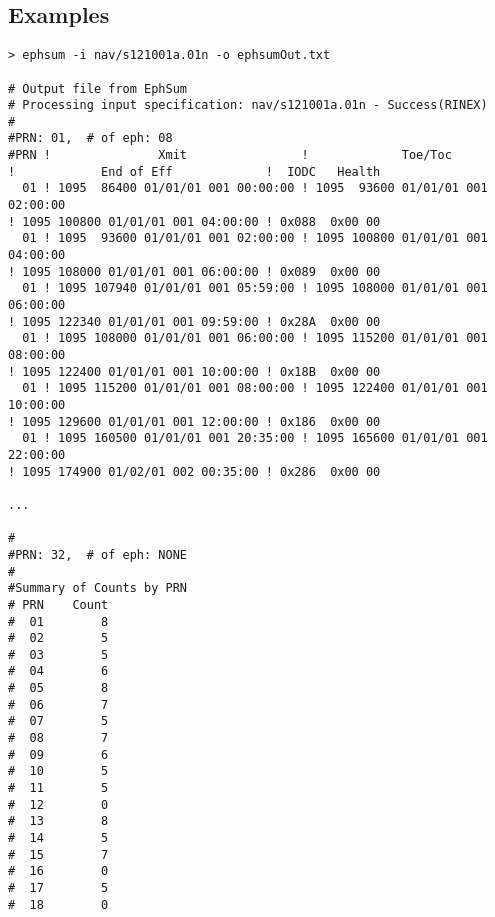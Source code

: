 \subsection{Examples}
\begin{\outputsize}
\begin{verbatim}
> ephsum -i nav/s121001a.01n -o ephsumOut.txt

# Output file from EphSum
# Processing input specification: nav/s121001a.01n - Success(RINEX)
#
#PRN: 01,  # of eph: 08
#PRN !               Xmit                !             Toe/Toc               
!            End of Eff             !  IODC   Health
  01 ! 1095  86400 01/01/01 001 00:00:00 ! 1095  93600 01/01/01 001 02:00:00 
! 1095 100800 01/01/01 001 04:00:00 ! 0x088  0x00 00 
  01 ! 1095  93600 01/01/01 001 02:00:00 ! 1095 100800 01/01/01 001 04:00:00 
! 1095 108000 01/01/01 001 06:00:00 ! 0x089  0x00 00 
  01 ! 1095 107940 01/01/01 001 05:59:00 ! 1095 108000 01/01/01 001 06:00:00 
! 1095 122340 01/01/01 001 09:59:00 ! 0x28A  0x00 00 
  01 ! 1095 108000 01/01/01 001 06:00:00 ! 1095 115200 01/01/01 001 08:00:00 
! 1095 122400 01/01/01 001 10:00:00 ! 0x18B  0x00 00 
  01 ! 1095 115200 01/01/01 001 08:00:00 ! 1095 122400 01/01/01 001 10:00:00 
! 1095 129600 01/01/01 001 12:00:00 ! 0x186  0x00 00 
  01 ! 1095 160500 01/01/01 001 20:35:00 ! 1095 165600 01/01/01 001 22:00:00 
! 1095 174900 01/02/01 002 00:35:00 ! 0x286  0x00 00 

...

#
#PRN: 32,  # of eph: NONE
#
#Summary of Counts by PRN
# PRN    Count
#  01        8
#  02        5
#  03        5
#  04        6
#  05        8
#  06        7
#  07        5
#  08        7
#  09        6
#  10        5
#  11        5
#  12        0
#  13        8
#  14        5
#  15        7
#  16        0
#  17        5
#  18        0

\end{verbatim}
\end{\outputsize}
%
